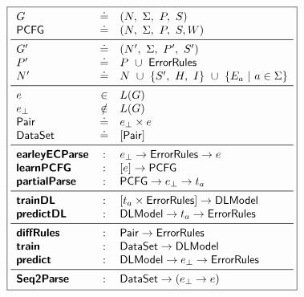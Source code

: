 \begin{figure}[h]
\small
\begin{minipage}[c]{\linewidth}
  \lstDeleteShortInline{|}
  \[
  \boxed{
  \begin{array}{lcl}
    G              & \defeq  & (N,\ \Sigma,\ P,\ S) \\
    \pcfgsym       & \defeq  & (N,\ \Sigma,\ P,\ S, W) \\
    \midrule
    G'             & \defeq  & (N',\ \Sigma,\ P',\ S') \\
    P'             & \defeq  & P\ \cup\ \errorrulessym \\
    N'             & \defeq  & N\ \cup\ \{S',\ H,\ I\}\ \cup\ \{E_a\ |\ a \in \Sigma\} \\
    \midrule
    e              & \in    & L(G) \\
    e_{\bot}       & \notin & L(G) \\
    \pairsym       & \defeq & e_{\bot} \times e \\
    \datasetsym    & \defeq & \List{\pairsym} \\
    \midrule
    \ecepsym       & : & e_{\bot} \to \errorrulessym \to e \\
    \learnPCFGsym  & : & \List{e} \to \pcfgsym \\
    \partialsym    & : & \pcfgsym \to e_{\bot} \to t_a  \\
    \midrule
    \trainDLsym    & : & \List{t_a \times \errorrulessym} \to \Model \\
    \predictDLsym  & : & \Model \to t_a \to \errorrulessym \\
    \midrule
    \diffsym       & : & \pairsym \to \errorrulessym \\
    \trainsym      & : & \datasetsym \to \Model \\
    \predictsym    & : & \Model \to e_{\bot} \to \errorrulessym \\
    \midrule
    \systemsym     & : & \datasetsym \to (e_{\bot} \to e) \\
  \end{array}
  }
  \]
  \lstMakeShortInline[mathescape=true]{|}
  \label{fig:api}
\end{minipage}
\end{figure}
